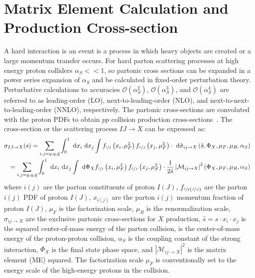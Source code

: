 \section{Matrix Element Calculation and Production Cross-section}
A hard interaction is an event is a process in which heavy objects are created or a large momentum transfer occurs.
For hard parton scattering processes at high energy proton colliders $\alpha_S << 1$, so partonic cross sections can be expanded in a power series expansion of $\alpha_S$ and be calculated in fixed-order perturbation theory. 
Perturbative calculations to accuracies $\mathcal{O}(\alpha^2_S)$, $\mathcal{O}(\alpha^3_S)$, and $\mathcal{O}(\alpha^4_S)$ are referred to as leading-order (LO), next-to-leading-order (NLO), and next-to-next-to-leading-order (NNLO), respectively.
The partonic cross-sections are convoluted with the proton PDFs to obtain $pp$ collision production cross-sections~\cite{BUCKLEY2011145}.
The cross-section or the scattering process $IJ \rightarrow X$ can be expressed as:
\begin{align}
\sigma_{IJ \rightarrow X}(s) = \sum_{i, j = g, q, \bar{q}}^{} \int_{0}^{1} \mathrm{~d} x_i \mathrm{~d} x_j \int f_{\sfrac{i}{I}}\left(x_i, \mu_F^2\right) f_{\sfrac{j}{J}}\left(x_j, \mu_F^2\right) \cdot \mathrm{~d}\hat{\sigma}_{i j \rightarrow X}\left(\hat{s}, \Phi_X, \mu_F, \mu_R, \alpha_S\right) \\
=\sum_{i, j=g, q, \bar{q}} \int_{0}^{1} \mathrm{~d} x_i \mathrm{~d} x_j \int \mathrm{~d} \Phi_X f_{\sfrac{i}{I}}\left(x_i, \mu_F^2\right) f_{\sfrac{j}{J}}\left(x_j, \mu_F^2\right) \cdot \frac{1}{2 \hat{s}}\left\vert \mathcal{M}_{i j \rightarrow X}\right\vert^2\left(\Phi_X, \mu_F, \mu_R, \alpha_S\right)
\label{ttbar_crosssection}
\end{align}
where $i(j)$ are the parton constituents of proton $I(J)$, $f_{{\sfrac{i}{I}}({\sfrac{j}{J}})}$ are the parton $i(j)$ PDF of proton $I(J)$, $x_{i(j)}$ are the parton $i(j)$ momentum fraction of proton $I(J)$, $\mu_F$ is the factorization scale, $\mu_R$ is the renormalization scale, $\sigma_{i j \rightarrow X}$ are the exclusive partonic cross-sections for $X$ production, $\hat{s} = s \cdot x_i \cdot x_j$ is the squared center-of-mass energy of the parton collision, \beamenergy is the center-of-mass energy of the proton-proton collision, $\alpha_S$ is the coupling constant of the strong interaction, $\Phi_X$ is the final state phase space, and $\left\vert \mathcal{M}_{i j \rightarrow X}\right\vert^2$ is the matrix element (ME) squared.
The factorization scale $\mu_F$ is conventionally set to the energy scale of the high-energy protons in the collision.
